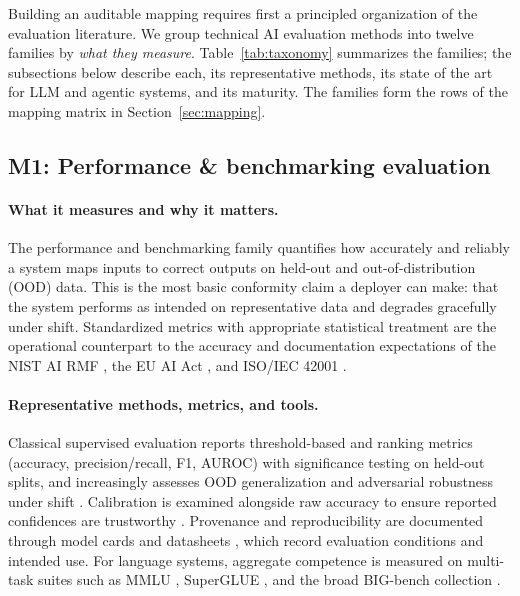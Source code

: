 Building an auditable mapping requires first a principled organization of the evaluation literature. We group technical AI evaluation methods into twelve families by \emph{what they measure}. Table~\ref{tab:taxonomy} summarizes the families; the subsections below describe each, its representative methods, its state of the art for LLM and agentic systems, and its maturity. The families form the rows of the mapping matrix in Section~\ref{sec:mapping}.





\subsection{M1: Performance \& benchmarking evaluation}

\paragraph{What it measures and why it matters.} The performance and benchmarking family quantifies how accurately and reliably a system maps inputs to correct outputs on held-out and out-of-distribution (OOD) data. This is the most basic conformity claim a deployer can make: that the system performs as intended on representative data and degrades gracefully under shift. Standardized metrics with appropriate statistical treatment are the operational counterpart to the accuracy and documentation expectations of the NIST AI RMF \cite{nist2023airmf}, the EU AI Act \cite{euaiact2024}, and ISO/IEC 42001 \cite{iso42001}.

\paragraph{Representative methods, metrics, and tools.} Classical supervised evaluation reports threshold-based and ranking metrics (accuracy, precision/recall, F1, AUROC) with significance testing on held-out splits, and increasingly assesses OOD generalization and adversarial robustness under shift \cite{li2024oodobustbench}. Calibration is examined alongside raw accuracy to ensure reported confidences are trustworthy \cite{le2024revisiting}. Provenance and reproducibility are documented through model cards \cite{mitchell2019modelcards} and datasheets \cite{gebru2018datasheets}, which record evaluation conditions and intended use. For language systems, aggregate competence is measured on multi-task suites such as MMLU \cite{hendrycks2020mmlu}, SuperGLUE \cite{wang2019superglue}, and the broad BIG-bench collection \cite{srivastava2023bigbench}.

